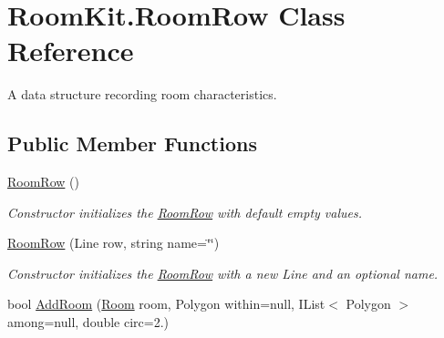 \hypertarget{class_room_kit_1_1_room_row}{}\section{Room\+Kit.\+Room\+Row Class Reference}
\label{class_room_kit_1_1_room_row}


A data structure recording room characteristics.  


\subsection*{Public Member Functions}
\begin{DoxyCompactItemize}
\item 
\mbox{\hyperlink{class_room_kit_1_1_room_row_addd348f8431a2c6281b9be1b40373594}{Room\+Row}} ()
\begin{DoxyCompactList}\small\item\em Constructor initializes the \mbox{\hyperlink{class_room_kit_1_1_room_row}{Room\+Row}} with default empty values. \end{DoxyCompactList}\item 
\mbox{\hyperlink{class_room_kit_1_1_room_row_a5f3de939efebb1560150ecf9be9f697c}{Room\+Row}} (Line row, string name=\char`\"{}\char`\"{})
\begin{DoxyCompactList}\small\item\em Constructor initializes the \mbox{\hyperlink{class_room_kit_1_1_room_row}{Room\+Row}} with a new Line and an optional name. \end{DoxyCompactList}\item 
bool \mbox{\hyperlink{class_room_kit_1_1_room_row_a461c7592711caf1d35a96693d77fd4df}{Add\+Room}} (\mbox{\hyperlink{class_room_kit_1_1_room}{Room}} room, Polygon within=null, I\+List$<$ Polygon $>$ among=null, double circ=2.)
\end{DoxyCompactItemize}

